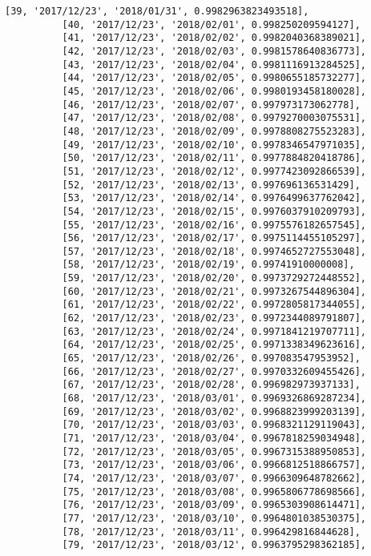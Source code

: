 \documentclass[11pt]{article}
\begin{document}
\begin{Verbatim}[commandchars=\\\{\}]
          [39, '2017/12/23', '2018/01/31', 0.9982963823493518],
          [40, '2017/12/23', '2018/02/01', 0.998250209594127],
          [41, '2017/12/23', '2018/02/02', 0.9982040368389021],
          [42, '2017/12/23', '2018/02/03', 0.9981578640836773],
          [43, '2017/12/23', '2018/02/04', 0.9981116913284525],
          [44, '2017/12/23', '2018/02/05', 0.9980655185732277],
          [45, '2017/12/23', '2018/02/06', 0.9980193458180028],
          [46, '2017/12/23', '2018/02/07', 0.997973173062778],
          [47, '2017/12/23', '2018/02/08', 0.9979270003075531],
          [48, '2017/12/23', '2018/02/09', 0.9978808275523283],
          [49, '2017/12/23', '2018/02/10', 0.9978346547971035],
          [50, '2017/12/23', '2018/02/11', 0.9977884820418786],
          [51, '2017/12/23', '2018/02/12', 0.9977423092866539],
          [52, '2017/12/23', '2018/02/13', 0.997696136531429],
          [53, '2017/12/23', '2018/02/14', 0.9976499637762042],
          [54, '2017/12/23', '2018/02/15', 0.9976037910209793],
          [55, '2017/12/23', '2018/02/16', 0.9975576182657545],
          [56, '2017/12/23', '2018/02/17', 0.9975114455105297],
          [57, '2017/12/23', '2018/02/18', 0.9974652727553048],
          [58, '2017/12/23', '2018/02/19', 0.99741910000008],
          [59, '2017/12/23', '2018/02/20', 0.9973729272448552],
          [60, '2017/12/23', '2018/02/21', 0.9973267544896304],
          [61, '2017/12/23', '2018/02/22', 0.9972805817344055],
          [62, '2017/12/23', '2018/02/23', 0.9972344089791807],
          [63, '2017/12/23', '2018/02/24', 0.9971841219707711],
          [64, '2017/12/23', '2018/02/25', 0.9971338349623616],
          [65, '2017/12/23', '2018/02/26', 0.997083547953952],
          [66, '2017/12/23', '2018/02/27', 0.9970332609455426],
          [67, '2017/12/23', '2018/02/28', 0.996982973937133],
          [68, '2017/12/23', '2018/03/01', 0.9969326869287234],
          [69, '2017/12/23', '2018/03/02', 0.9968823999203139],
          [70, '2017/12/23', '2018/03/03', 0.9968321129119043],
          [71, '2017/12/23', '2018/03/04', 0.9967818259034948],
          [72, '2017/12/23', '2018/03/05', 0.9967315388950853],
          [73, '2017/12/23', '2018/03/06', 0.9966812518866757],
          [74, '2017/12/23', '2018/03/07', 0.9966309648782662],
          [75, '2017/12/23', '2018/03/08', 0.9965806778698566],
          [76, '2017/12/23', '2018/03/09', 0.9965303908614471],
          [77, '2017/12/23', '2018/03/10', 0.9964801038530375],
          [78, '2017/12/23', '2018/03/11', 0.996429816844628],
          [79, '2017/12/23', '2018/03/12', 0.9963795298362185],

\end{Verbatim}
\end{document}
